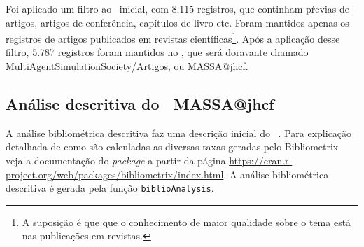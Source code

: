 Foi aplicado um filtro ao \dataset\   inicial, com 8.115 registros, que continham pŕevias de artigos, artigos de conferência, capítulos de livro etc. Foram mantidos apenas os registros de artigos publicados em revistas científicas\footnote{A suposição é que que o conhecimento de maior qualidade sobre o tema está nas publicações em revistas.}. Após a aplicação desse filtro, 5.787 registros foram mantidos no \dataset, que será doravante chamado MultiAgentSimulationSociety/Artigos, ou MASSA@jhcf.

\subsection{Análise descritiva do \dataset\   MASSA@jhcf}

A análise bibliométrica descritiva faz uma descrição inicial do \dataset\  . Para explicação detalhada de como são calculadas as diversas taxas geradas pelo Bibliometrix veja a documentação do \textit{package} a partir da página \url{https://cran.r-project.org/web/packages/bibliometrix/index.html}. A análise bibliométrica descritiva é gerada pela função \texttt{biblioAnalysis}.

